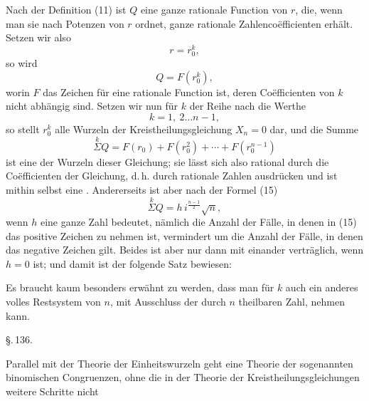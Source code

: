 
Nach der Definition (11) ist $Q$ eine ganze rationale Function
von $r$, die, wenn man sie nach Potenzen von $r$ ordnet, ganze
rationale Zahlenco\"efficienten erh\"alt. Setzen wir also
\[
r = r_0^k,
\]
so wird
\[
Q = F(r_0^k),
\]
worin $F$ das Zeichen f\"ur eine rationale Function ist, deren
Co\"efficienten von $k$ nicht abh\"angig sind. Setzen wir nun f\"ur
$k$ der Reihe nach die Werthe
\[
k = 1,\ 2 \ldots n-1,
\]
so stellt $r_0^k$ alle Wurzeln der Kreistheilungsgleichung $X_n = 0$
dar, und die Summe
\[
\overset{k}{\Sigma} Q = F(r_0) + F(r_0^2) + \cdots + F(r_0^{n-1})
\]
ist eine  der Wurzeln dieser Gleichung; sie
l\"asst sich also rational durch die Co\"efficienten der Gleichung,
d.\,h. durch rationale Zahlen ausdr\"ucken und ist mithin selbst eine
. Andererseits ist aber nach der Formel (15)
\[
\overset{k}{\Sigma} Q = h\, i^{\frac{n-1}{2}} \sqrt{n},
\]
wenn $h$ eine ganze Zahl bedeutet, n\"amlich die Anzahl der F\"alle,
in denen in (15) das positive Zeichen zu nehmen ist, vermindert um
die Anzahl der F\"alle, in denen das negative Zeichen gilt. Beides
ist aber nur dann mit einander vertr\"aglich, wenn $h = 0$ ist; und
damit ist der folgende Satz bewiesen:


Es braucht kaum besonders erw\"ahnt zu werden, dass man f\"ur $k$
auch ein anderes volles Restsystem von $n$, mit Ausschluss der durch
$n$ theilbaren Zahl, nehmen kann.

\begin{center}
%
%
\S.\,136.\\[2pt]
\end{center}

Parallel mit der Theorie der Einheitswurzeln geht eine Theorie der
sogenannten binomischen Congruenzen, ohne die in der Theorie der
Kreistheilungsgleichungen weitere Schritte nicht
